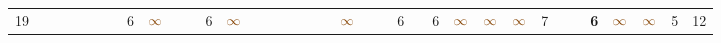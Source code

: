 \begin{landscape}
\begin{table}
\begin{adjustwidth}{-2.6cm}{}
{\begin{tabular}{l|lllllllllllllllllllllllllllllllll|ll}
		19   &            &                                                                 &                                                                 &                                                                 &                                                                 &                                                                 & 6                                                               & $\textcolor[rgb]{0.541,0.29,0.043}{\infty}$ &                                                                 &                                                                 & 6                                                               & $\textcolor[rgb]{0.541,0.29,0.043}{\infty}$ &                                                                 &                                                                 &                                                                 &                                                                 &                                                                 &                                                                 & $\textcolor[rgb]{0.541,0.29,0.043}{\infty}$ &                                                                 &                                                                 & 6                                                               &                                                                 & 6                                                               & $\textcolor[rgb]{0.541,0.29,0.043}{\infty}$ & $\textcolor[rgb]{0.541,0.29,0.043}{\infty}$ & $\textcolor[rgb]{0.541,0.29,0.043}{\infty}$ & 7                                                               &                                                                 &                                                                 & \textbf{6}                                                      & $\textcolor[rgb]{0.541,0.29,0.043}{\infty}$ & $\textcolor[rgb]{0.541,0.29,0.043}{\infty}$ & 5          & 12          \\

\end{tabular}}
\end{adjustwidth}
\end{table}
\end{landscape}
